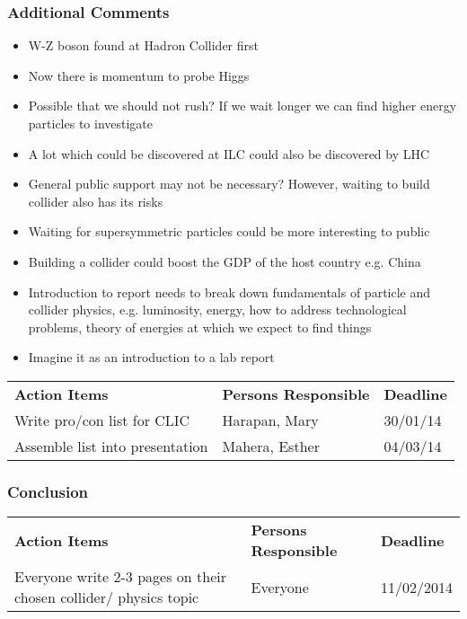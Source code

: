 \subsubsection{Additional Comments}

\begin{itemize}
\item W-Z boson found at Hadron Collider first
\item  Now there is momentum to probe Higgs
\item  Possible that we should not rush? If we wait longer we can find higher energy particles to investigate
\item  A lot which could be discovered at ILC could also be discovered by LHC
 
\item  General public support may not be necessary? However, waiting to build collider also has its risks
\item  Waiting for supersymmetric particles could be more interesting to public
 
\item  Building a collider could boost the GDP of the host country e.g. China
\item  Introduction to report needs to break down fundamentals of particle and collider physics, e.g. luminosity, energy, how to address technological problems, theory of energies at which we expect to find things
\item  Imagine it as an introduction to a lab report
\end{itemize}


\begin{tabularx}{\textwidth}{X p{4.5cm} p{1.2cm}}
  \textbf{Action Items} & \textbf{Persons Responsible} & \textbf{Deadline} \\
  Write pro/con list for CLIC & Harapan, Mary & 30/01/14 \\
  Assemble list into presentation & Mahera, Esther & 04/03/14 \\
\end{tabularx}



\subsubsection{Conclusion}

\begin{tabularx}{\textwidth}{X p{4.5cm} p{1.2cm}}
  \textbf{Action Items} & \textbf{Persons Responsible} & \textbf{Deadline} \\
  Everyone write 2-3 pages on their chosen collider/ physics topic
& Everyone
& 11/02/2014 \\
\end{tabularx}


